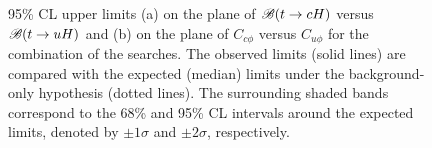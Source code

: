 \documentclass[PAPER, coverpage, atlasdraft=true, texlive=2016, UKenglish]{\ATLASLATEXPATH atlasdoc}
\begin{document}
\begin{figure}[t!]
\begin{center}
\caption{\small {95\% CL upper limits (a) on the plane of $\mathscr{B}(t\to cH)$ versus $\mathscr{B}(t\to uH)$ and (b) on the plane 
of $C_{c\phi}$ versus $C_{u\phi}$ for the combination of the searches. The observed limits (solid lines) are compared with the expected (median) limits under the background-only hypothesis (dotted lines). The surrounding shaded bands correspond to the 68\% and 95\% CL intervals around the expected limits, 
denoted by $\pm 1\sigma$ and $\pm 2\sigma$, respectively.}}
\label{fig:limits_combo_2D} 
\end{center}
\end{figure}
\end{document}
